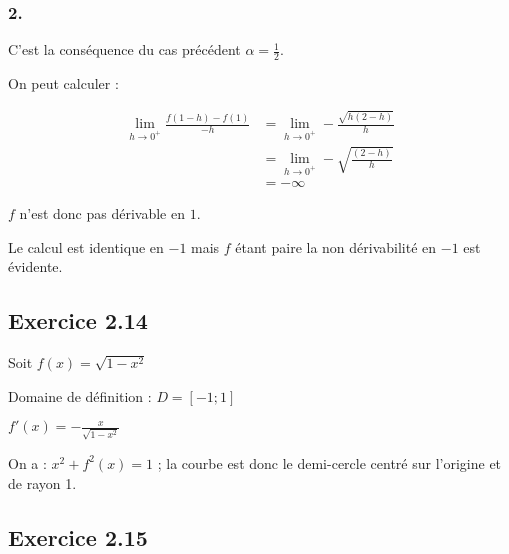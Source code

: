\documentclass[a4paper,10pt]{report}
\begin{document}
\subsubsection*{2.}

C'est la conséquence du cas précédent $\alpha = \frac{1}{2}$.

On peut calculer :

\begin{equation*}
	\begin{split}
		\lim_{h \rightarrow 0^{+}} \frac{f(1-h) - f(1)}{-h}
			&= \lim_{h \rightarrow 0^{+}} -\frac{\sqrt{h(2-h)}}{h} \\
			&= \lim_{h \rightarrow 0^{+}} -\sqrt{\frac{(2-h)}{h}} \\
			&= -\infty
	\end{split}
\end{equation*}

$f$ n'est donc pas dérivable en $1$.

Le calcul est identique en $-1$ mais $f$ étant paire la non dérivabilité en $-1$ est évidente.


\subsection*{Exercice 2.14}

Soit $f(x) = \sqrt{1-x^2}$

Domaine de définition : $D = [-1 ; 1]$

$f'(x) = -\frac{x}{\sqrt{1-x^2}}$



On a : $x^2 + f^2(x) = 1$ ; la courbe est donc le demi-cercle centré sur l'origine et de rayon 1.

\subsection*{Exercice 2.15}
\end{document}
